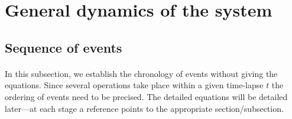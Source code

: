 \documentclass{article}
\begin{document}



\section{General dynamics of the system}

\subsection{Sequence of events}

\paragraph{}
In this subsection, we establish the chronology of events without giving the equations. Since several operations take place within a given time-lapse $t$ the ordering of events need to be precised. The detailed equations will be detailed later---at each stage a reference points to the appropriate section/subsection.
\end{document}
